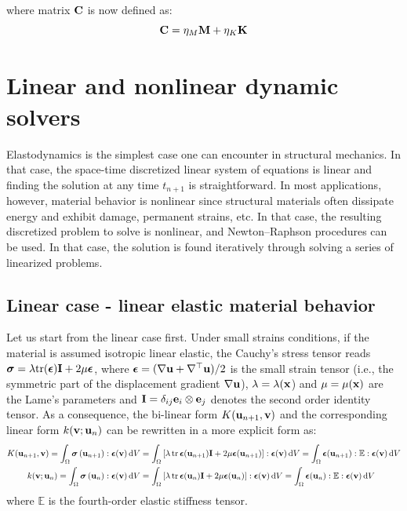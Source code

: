 \documentclass{report}
\newcommand{\bM}{\textbf{M}}
\newcommand{\bx}{\textbf{x}}
\newcommand{\bu}{\textbf{u}}
\newcommand{\bv}{\textbf{v}}
\newcommand{\tr}{\mathop{\rm tr}}
\def\bepsilon{\mbox{\boldmath${\epsilon}$}}
\def\bsigma{\mbox{\boldmath${\sigma}$}}
\def\bC{{\bf C}}
\def\be{{\bf e}}
\def\be{{\bf{e}}}
\def\bI{{{\bf{I}}}}
\def\bK{{\bf K}}
\def\bM{{\bf M}}
\def\bx{{\bf{x}}}
\def\bu{{\bf{u}}}
\def\bv{{\bf{v}}}
\begin{document}
where matrix $\bC$ is now defined as:
\begin{equation}
\bC=\eta_{M}\bM+\eta_{K}\bK
\end{equation}


\section{Linear and nonlinear dynamic solvers}

Elastodynamics is the simplest case one can encounter in structural mechanics. In that case, the space-time discretized linear system of equations is linear and finding the solution at any time $t_{n+1}$ is straightforward. In most applications, however, material behavior is nonlinear since structural materials often dissipate energy and exhibit
damage, permanent strains, etc. In that case, the resulting discretized problem to solve is nonlinear, and Newton--Raphson procedures can be used. In that case, the solution is found iteratively through solving a series of linearized problems.

\subsection{Linear case - linear elastic material behavior}

Let us start from the linear case first. Under small strains conditions, if the material is assumed isotropic linear elastic, the Cauchy's stress tensor reads $\bsigma=\lambda\text{tr}(\bepsilon)\bI+2\mu\bepsilon$,
where $\bepsilon=(\nabla\bu+\nabla^{\top}\bu)/2$ is the small strain tensor (i.e., the symmetric part of the displacement gradient $\nabla\bu$), $\lambda=\lambda(\bx$) and $\mu=\mu(\bx)$ are the Lame's parameters and $\bI=\delta_{ij}\be_{i}\otimes\be_{j}$ denotes the second order identity tensor. As a consequence, the bi-linear form $K({\bu_{n+1}},\bv)$ and the corresponding linear form $k(\bv;{\bu_{n}})$ can be rewritten in a more explicit form as:
\begin{equation}
\begin{aligned}K({\bu_{n+1}},\bv)=\int_{\Omega}\bsigma\left({\bu_{n+1}}\right):\bepsilon(\bv)\,{\rm d}V & =\int_{\Omega}\left[\lambda\tr\bepsilon(\bu_{n+1})\bI+2\mu\bepsilon(\bu_{n+1})\right]:\bepsilon(\bv)\,{\rm d}V=\int_{\Omega}\bepsilon(\bu_{n+1}):\mathbb{E}:\bepsilon(\bv)\,{\rm d}V\\
k(\bv;{\bu_{n}})=\int_{\Omega}\bsigma\left({\bu_{n}}\right):\bepsilon(\bv)\,{\rm d}V & =\int_{\Omega}\left[\lambda\tr\bepsilon(\bu_{n})\bI+2\mu\bepsilon(\bu_{n})\right]:\bepsilon(\bv)\,{\rm d}V=\int_{\Omega}\bepsilon(\bu_{n}):\mathbb{E}:\bepsilon(\bv)\,{\rm d}V
\end{aligned}
\end{equation}
where $\mathbb{E}$ is the fourth-order elastic stiffness tensor. 
\end{document}
